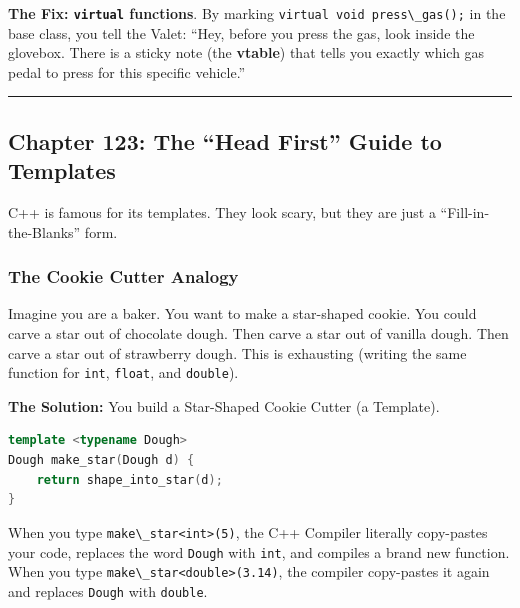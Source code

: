 \textbf{The Fix: \passthrough{\lstinline!virtual!} functions}. By
marking \passthrough{\lstinline!virtual void press\_gas();!} in the base
class, you tell the Valet: ``Hey, before you press the gas, look inside
the glovebox. There is a sticky note (the \textbf{vtable}) that tells
you exactly which gas pedal to press for this specific vehicle.''

\begin{center}\rule{0.5\linewidth}{0.5pt}\end{center}

\hypertarget{chapter-123-the-head-first-guide-to-templates}{%
\subsection{Chapter 123: The ``Head First'' Guide to
Templates}\label{chapter-123-the-head-first-guide-to-templates}}

C++ is famous for its templates. They look scary, but they are just a
``Fill-in-the-Blanks'' form.

\hypertarget{the-cookie-cutter-analogy}{%
\subsubsection{The Cookie Cutter
Analogy}\label{the-cookie-cutter-analogy}}

Imagine you are a baker. You want to make a star-shaped cookie. You
could carve a star out of chocolate dough. Then carve a star out of
vanilla dough. Then carve a star out of strawberry dough. This is
exhausting (writing the same function for \passthrough{\lstinline!int!},
\passthrough{\lstinline!float!}, and \passthrough{\lstinline!double!}).

\textbf{The Solution:} You build a Star-Shaped Cookie Cutter (a
Template).

\begin{lstlisting}[language={C++}]
template <typename Dough>
Dough make_star(Dough d) {
    return shape_into_star(d);
}
\end{lstlisting}

When you type \passthrough{\lstinline!make\_star<int>(5)!}, the C++
Compiler literally copy-pastes your code, replaces the word
\passthrough{\lstinline!Dough!} with \passthrough{\lstinline!int!}, and
compiles a brand new function. When you type
\passthrough{\lstinline!make\_star<double>(3.14)!}, the compiler
copy-pastes it again and replaces \passthrough{\lstinline!Dough!} with
\passthrough{\lstinline!double!}.

